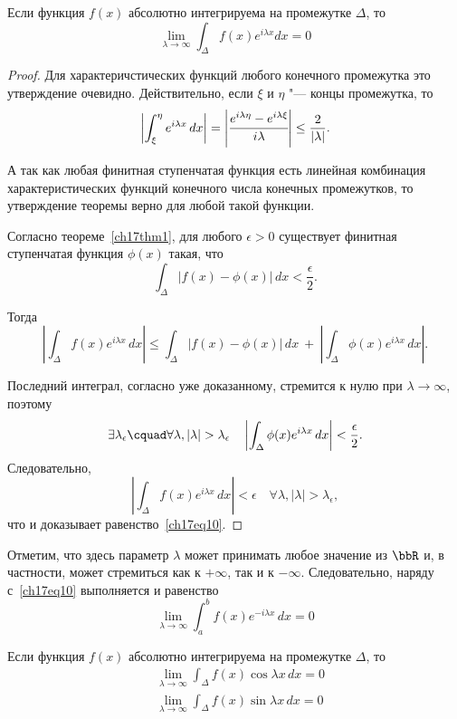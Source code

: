 \begin{thm} \label{ch17thm2}
Если функция $f(x)$ абсолютно интегрируема на промежутке $\Delta$, то
\begin{equation} \label{ch17eq10}
\lim_{\lambda \to \infty}\int_{\Delta} f(x)e^{i\lambda x}dx = 0
\end{equation}
\end{thm}
\begin{proof}
Для характеричстических функций любого конечного промежутка это утверждение очевидно. Действительно, если $\xi$ и $\eta$ "--- концы промежутка, то
$$
\left|\int_{\xi}^{\eta} e^{i\lambda x}\,dx\right| = \left|\cfrac{e^{i\lambda \eta} - e^{i\lambda \xi}}{i\lambda}\right| \le \frac{2}{|\lambda|}.
$$

А так как любая финитная ступенчатая функция есть линейная комбинация характеристических функций конечного числа конечных промежутков, то утверждение теоремы верно для любой такой функции.

Согласно теореме~\ref{ch17thm1}, для любого $\epsilon > 0$ существует финитная ступенчатая функция $\phi(x)$ такая, что
$$
\int_{\Delta} |f(x) - \phi(x)|\,dx < \frac{\epsilon}{2}.
$$

Тогда
$$
\left|\int_{\Delta} f(x)e^{i\lambda x}\,dx\right| \le \int_{\Delta} |f(x) - \phi(x)|\,dx\ +\ \left|\int_{\Delta} \phi(x)e^{i\lambda x}\,dx\right|.
$$

Последний интеграл, согласно уже доказанному, стремится к нулю при $\lambda \to \infty$, поэтому
$$
\exists \lambda_{\epsilon} \cquad \forall \lambda, |\lambda| > \lambda_{\epsilon} \quad \left|\int_{\Delta} \phi(x)e^{i\lambda x}\,dx\right| < \frac{\epsilon}{2}.
$$
Следовательно,
$$
\left|\int_{\Delta} f(x)e^{i\lambda x}\,dx\right| < \epsilon \quad \forall \lambda, |\lambda| > \lambda_{\epsilon},
$$
что и доказывает равенство~\eqref{ch17eq10}.
\end{proof}

Отметим, что здесь параметр $\lambda$ может принимать любое значение из $\bbR$ и, в частности, может стремиться как к $+\infty$, так и к $-\infty$. Следовательно, наряду с~\eqref{ch17eq10} выполняется и равенство
$$
\lim_{\lambda \to \infty}\int_{a}^{b} f(x)e^{-i\lambda x}\,dx = 0
$$

\begin{cons}
Если функция $f(x)$ абсолютно интегрируема на промежутке $\Delta$, то
\begin{align*}
&\lim_{\lambda \to \infty}\int_{\Delta} f(x)\cos{\lambda x}\,dx = 0\\
&\lim_{\lambda \to \infty}\int_{\Delta} f(x)\sin{\lambda x}\,dx = 0
\end{align*}
\end{cons}

